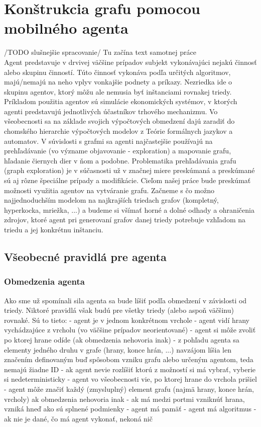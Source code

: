 \chapter{Konštrukcia grafu pomocou mobilného agenta}
\thispagestyle{empty}
/TODO slušnejšie spracovanie/
Tu začína text samotnej práce\\
Agent predstavuje v drvivej väčšine prípadov subjekt vykonávajúci nejakú činnosť alebo skupinu činností. Túto činnosť vykonáva podľa určitých algoritmov, majú/nemajú na neho vplyv vonkajšie podnety a príkazy. Nezriedka ide o skupinu agentov, ktorý môžu ale nemusia byť inštanciami rovnakej triedy. Príkladom použitia agentov sú simulácie ekonomických systémov, v ktorých agenti predstavujú jednotlivých účastníkov trhového mechanizmu.
Vo všeobecnosti sa na základe svojich výpočtových obmedzení dajú zaradiť do chomského hierarchie výpočtových modelov z Teórie formálnych jazykov a automatov.
V súvislosti s grafmi sa agenti najčastejšie používajú na prehľadávanie (vo význame objavovanie - exploration) a mapovanie grafu, hľadanie čiernych dier v ňom a podobne.
Problematika prehľadávania grafu (graph exploration) je v súčasnosti už v značnej miere preskúmaná a preskúmané sú aj rôzne špeciálne prípady a modifikácie.
Cieľom našej práce bude preskúmať možnosti využitia agentov na vytváranie grafu. Začneme s čo možno najjednoduchším modelom na najkrajších triedach grafov (kompletný, hyperkocka, mriežka, ...) a budeme si všímať horné a dolné odhady a ohraničenia zdrojov, ktoré agent pri generovaní grafov danej triedy potrebuje vzhľadom na triedu a jej konkrétnu inštanciu.
\section{Všeobecné pravidlá pre agenta}
\subsection{Obmedzenia agenta}
Ako sme už spomínali sila agenta sa bude líšiť podľa obmedzení v závislosti od triedy. Niktoré pravidlá však budú pre všetky triedy (alebo aspoň väčšinu) rovnaké. Sú to tieto:
- agent je v jednom konkrétnom vrchole
- agent vidí hrany vychádzajúce z vrcholu (vo väčšine prípadov neorientované)
- agent si môže zvoliť po ktorej hrane odíde (ak obmedzenia nehovoria inak)
- z pohľadu agenta sa elementy jedného druhu v grafe (hrany, konce hrán, ...) navzájom líšia len značením definovaným buď spôsobom vzniku grafu alebo určeným agentom, teda nemajú žiadne ID
- ak agent nevie rozlíšiť ktorú z možností si má vybrať, vyberie si nedeterministicky
- agent vo všeobecnosti vie, po ktorej hrane do vrchola prišiel
- agent môže značiť každý (zmysluplný) element grafu (najmä hrany, konce hrán, vrcholy) ak obmedzenia nehovoria inak
- ak má medzi portmi vzniknúť hrana, vzniká hneď ako sú splnené podmienky
- agent má pamäť
- agent má algoritmus
- ak nie je dané, čo má agent vykonať, nekoná nič

